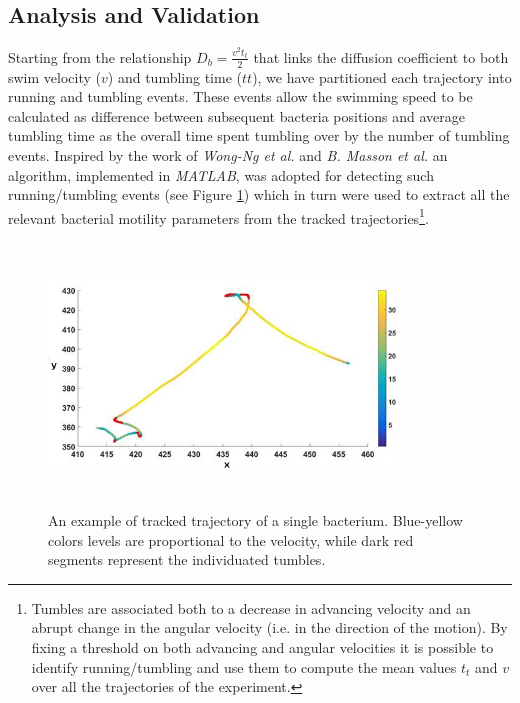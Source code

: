 \documentclass[conference]{IEEEtran}
\begin{document}
\subsection{Analysis and Validation}
Starting from the relationship $D_b=  \frac{v^2 t_t}{2}$  \cite{Berg:1993} that links the diffusion coefficient to both swim velocity ($v$) and tumbling time ($tt$), 
we have partitioned each trajectory into running and tumbling events. 
These events allow the swimming speed to be calculated as difference between subsequent bacteria positions and average tumbling time as the overall time spent tumbling over by the number of tumbling events. 
Inspired by the work of \textit{Wong-Ng et al.} \cite{Wong2016} and \textit{B. Masson et al.} \cite{Masson:2011} an algorithm, implemented in \textit{MATLAB}, was adopted for detecting such running/tumbling events (see Figure \ref{runtumbledetection})  which in turn were used to extract all the relevant bacterial motility parameters from the tracked trajectories\footnote{Tumbles are associated both to a decrease in advancing velocity and an abrupt change in the angular velocity (i.e. in the direction of the motion). By fixing a threshold on both advancing and angular velocities it is possible to identify running/tumbling and use them to compute the mean values $t_t$ and $v$ over all the trajectories of the experiment.}.
    \begin{figure}[htp]
         \includegraphics[width=9.3cm,height=7cm]{./images/runtumble.png}
        \caption{An example of tracked trajectory of a single bacterium. Blue-yellow colors levels are proportional to the velocity, while dark red segments represent the individuated tumbles.}
        \label{runtumbledetection}
    \end{figure}
\end{document}
